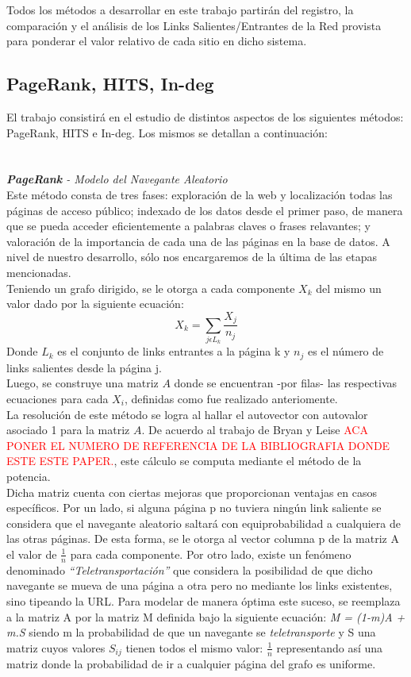 \documentclass[a4paper]{article}
\begin{document}
Todos los m\'etodos a desarrollar en este trabajo partir\'an del registro, la comparaci\'on y el an\'alisis de los Links Salientes/Entrantes  de la Red provista para ponderar el valor relativo de cada sitio en dicho sistema.
\\
\subsection{PageRank, HITS, In-deg}
El trabajo consistir\'a en el estudio de distintos aspectos de los siguientes m\'etodos: PageRank,
HITS e In-deg. Los mismos se detallan a continuaci\'on: \\
\\
\\
\indent \indent \emph{\textbf{PageRank} - Modelo del Navegante Aleatorio} \\
\indent Este m\'etodo consta de tres fases: exploraci\'on de la web y localizaci\'on todas las p\'aginas de acceso p\'ublico; indexado de los datos desde el primer paso, de manera que se pueda acceder eficientemente a palabras claves o frases relavantes; y valoraci\'on de la importancia de cada una de las p\'aginas en la base de datos. A nivel de nuestro desarrollo, s\'olo nos encargaremos de la \'ultima de las etapas mencionadas.\\
\indent Teniendo un grafo dirigido, se le otorga a cada componente $X_k$ del mismo un valor dado por la siguiente ecuaci\'on:
\[
 X_k = \sum_{j \epsilon L_k} \frac{X_j}{n_j}
\]
Donde\emph{ $L_k$} es el conjunto de links entrantes a la p\'agina k y \emph{$n_j$} es el n\'umero de links salientes desde la p\'agina j.\\
\indent Luego, se construye una matriz $A$ donde se encuentran -por filas- las respectivas ecuaciones para cada $X_i$, definidas como fue realizado anteriomente.\\
\indent La resoluci\'on de este m\'etodo se logra al hallar el autovector con autovalor asociado 1 para la matriz $A$. De acuerdo al trabajo de Bryan y Leise \textcolor{red}{ACA PONER EL NUMERO DE REFERENCIA DE LA BIBLIOGRAFIA DONDE ESTE ESTE PAPER.}, este c\'alculo se computa mediante el m\'etodo de la potencia. \\
\indent Dicha matriz cuenta con ciertas mejoras que proporcionan ventajas en casos espec\'ificos. Por un lado, si alguna p\'agina p no tuviera ning\'un link saliente se considera que el navegante aleatorio saltar\'a con equiprobabilidad a cualquiera de las otras p\'aginas. De esta forma, se le otorga al vector columna p de la matriz A el valor de $\frac{1}{n}$ para cada componente. Por otro lado, existe un fen\'omeno denominado \textit{``Teletransportaci\'on''} que considera la posibilidad de que dicho navegante se mueva de una p\'agina a otra pero no mediante los links existentes, sino tipeando la URL. Para modelar de manera \'optima este suceso, se reemplaza a la matriz A por la matriz M definida bajo la siguiente ecuaci\'on: \textit{M = (1-m)A + m.S} siendo m la probabilidad de que un navegante se \textit{teletransporte} y S una matriz cuyos valores $S_{ij}$ tienen todos el mismo valor: $\frac{1}{n}$ representando as\'i una matriz donde la probabilidad de ir a cualquier p\'agina del grafo es uniforme.\\
\end{document}
